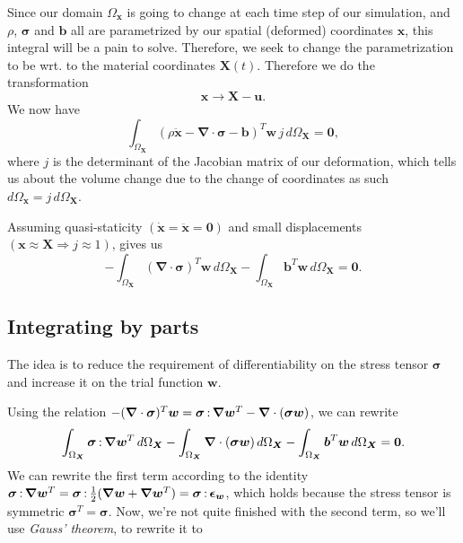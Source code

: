 \documentclass[acmtog]{acmart}
\newcommand{\ddotproduct}[2]{#1 \hspace{-1pt}:\hspace{-1pt} #2}
\begin{document}
Since our domain $\Omega_{\boldsymbol x}$ is going to change at each time step of our simulation, and $\rho$, $\boldsymbol \sigma$ and $\boldsymbol b$ all are parametrized by our spatial (deformed) coordinates $\boldsymbol x$, this integral will be a pain to solve. Therefore, we seek to change the parametrization to be wrt. to the material coordinates $\boldsymbol X(t)$.
Therefore we do the transformation
%
\begin{equation}
  \boldsymbol x \to \boldsymbol X - \boldsymbol u.
\end{equation}
%
We now have
%
\begin{equation}
  \int_{\Omega_{\boldsymbol X}} (\rho \ddot{\boldsymbol x} - \boldsymbol \nabla \cdot \boldsymbol \sigma - \boldsymbol b)^T \boldsymbol w \,j\, d{\Omega_{\boldsymbol X}} = \boldsymbol 0,
\end{equation}
%
where $j$ is the determinant of the Jacobian matrix of our deformation, which tells us about the volume change due to the change of coordinates as such $d\Omega_{\boldsymbol x} = j \, d\Omega_{\boldsymbol X}$.

Assuming quasi-staticity $(\dot {\boldsymbol x} = \ddot {\boldsymbol x} = \boldsymbol 0)$ and small displacements $(\boldsymbol x \approx \boldsymbol X \Rightarrow j \approx 1)$, gives us
%
\begin{equation}
  -\int_{\Omega_{\boldsymbol X}} (\boldsymbol \nabla \cdot \boldsymbol \sigma)^T \boldsymbol w \, d\Omega_{\boldsymbol X} - \int_{\Omega_{\boldsymbol X}} \boldsymbol b^T \boldsymbol w \, d \Omega_{\boldsymbol X} = \boldsymbol 0.
\end{equation}
%

\subsection{Integrating by parts}
The idea is to reduce the requirement of differentiability on the stress tensor $\boldsymbol \sigma$ and increase it on the trial function $\boldsymbol w$.

Using the relation $- (\boldsymbol \nabla \cdot \boldsymbol \sigma)^T \boldsymbol w= \ddotproduct{\boldsymbol \sigma}{\boldsymbol \nabla \boldsymbol w^T} - \boldsymbol \nabla \cdot (\boldsymbol \sigma \boldsymbol w)$, we can rewrite
%
\begin{equation}
  \int_{\Omega_{\boldsymbol X}} \ddotproduct{\boldsymbol \sigma}{\boldsymbol \nabla \boldsymbol w^T} \, d\Omega_{\boldsymbol X} - \int_{\Omega_{\boldsymbol X}} \boldsymbol \nabla \cdot (\boldsymbol \sigma \boldsymbol w) \, d\Omega_{\boldsymbol X} - \int_{\Omega_{\boldsymbol X}} \boldsymbol b^T \boldsymbol w \, d\Omega_{\boldsymbol X} = \boldsymbol 0.
\end{equation}
%
We can rewrite the first term according to the identity $\ddotproduct{\boldsymbol \sigma}{\boldsymbol \nabla \boldsymbol w^T} = \ddotproduct{\boldsymbol \sigma}{\frac{1}{2} (\boldsymbol \nabla \boldsymbol w + \boldsymbol \nabla \boldsymbol w^T)} = \ddotproduct{\boldsymbol\sigma}{\boldsymbol \epsilon_{\boldsymbol w}}$, which holds because the stress tensor is symmetric $\boldsymbol\sigma^T = \boldsymbol\sigma$. Now, we're not quite finished with the second term, so we'll use \textit{Gauss' theorem}, to rewrite it to
\end{document}
